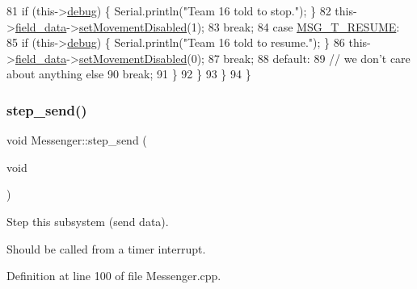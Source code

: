 \begin{DoxyCode}
81                     \textcolor{keywordflow}{if} (this->\hyperlink{class_messenger_a103d1964b9540a6b6b1c4ea7d79f3af3}{debug}) \{ Serial.println(\textcolor{stringliteral}{"Team 16 told to stop."}); \}
82                     this->\hyperlink{class_messenger_a8e4a16dc0dcfa44af9030a9ad8f69fa2}{field\_data}->\hyperlink{class_field_data_a04b6872f909539d5667adfb584b659ed}{setMovementDisabled}(1);
83                     \textcolor{keywordflow}{break};
84                 \textcolor{keywordflow}{case} \hyperlink{config_8h_a1be350e1dba9300cb526a23fcf8fb4be}{MSG\_T\_RESUME}:
85                     \textcolor{keywordflow}{if} (this->\hyperlink{class_messenger_a103d1964b9540a6b6b1c4ea7d79f3af3}{debug}) \{ Serial.println(\textcolor{stringliteral}{"Team 16 told to resume."}); \}
86                     this->\hyperlink{class_messenger_a8e4a16dc0dcfa44af9030a9ad8f69fa2}{field\_data}->\hyperlink{class_field_data_a04b6872f909539d5667adfb584b659ed}{setMovementDisabled}(0);
87                     \textcolor{keywordflow}{break};
88                 \textcolor{keywordflow}{default}:
89                     \textcolor{comment}{// we don't care about anything else}
90                     \textcolor{keywordflow}{break};
91             \}
92         \}
93     \}
94 \}
\end{DoxyCode}
\mbox{\label{class_messenger_a7e37226a7ee3e139fe22e05067e0013b}} 
\subsubsection{\texorpdfstring{step\+\_\+send()}{step\_send()}}
{\footnotesize\ttfamily void Messenger\+::step\+\_\+send (\begin{DoxyParamCaption}\item[{void}]{ }\end{DoxyParamCaption})}



Step this subsystem (send data). 

Should be called from a timer interrupt. 

Definition at line 100 of file Messenger.\+cpp.


